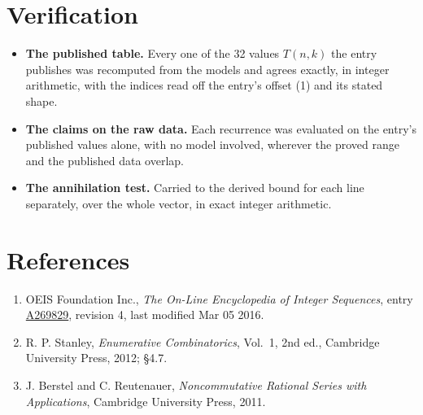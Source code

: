 \documentclass[11pt]{article}
\theoremstyle{definition}
\begin{document}
\section{Verification}

\begin{itemize}

\item {\bfseries The published table.} Every one of the 32 values $T(n,k)$ the entry publishes was recomputed from the models and agrees exactly, in integer arithmetic, with the indices read off the entry's offset (1) and its stated shape.

\item {\bfseries The claims on the raw data.} Each recurrence was evaluated on the entry's published values alone, with no model involved, wherever the proved range and the published data overlap.

\item {\bfseries The annihilation test.} Carried to the derived bound for each line separately, over the whole vector, in exact integer arithmetic.

\end{itemize}

\section{References}

\begin{enumerate}

\item OEIS Foundation Inc., \emph{The On-Line Encyclopedia of Integer Sequences}, entry \href{https://oeis.org/A269829}{A269829}, revision 4, last modified Mar 05 2016.

\item R. P. Stanley, \emph{Enumerative Combinatorics}, Vol.~1, 2nd ed., Cambridge University Press, 2012; \S4.7.

\item J. Berstel and C. Reutenauer, \emph{Noncommutative Rational Series with Applications}, Cambridge University Press, 2011.

\end{enumerate}
\end{document}
